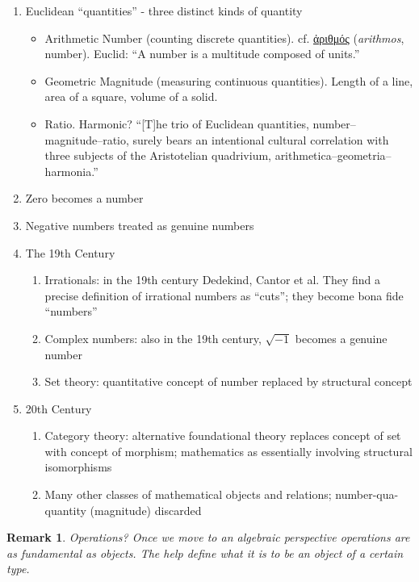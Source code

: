 \documentclass[11pt,twoside]{article}
\newtheorem{remark}{Remark}
\begin{document}
\begin{enumerate}
\item Euclidean ``quantities'' - three distinct kinds of quantity
\begin{itemize}
\item Arithmetic Number (counting discrete quantities).  cf. \href{http://www.perseus.tufts.edu/hopper/text?doc=Perseus\%3Atext\%3A1999.04.0057\%3Aentry\%3Da)riqmo\%2Fs}{ἀριθμός} (\textit{arithmos}, number).  Euclid: ``A number is a multitude composed of units.''
\item Geometric Magnitude (measuring continuous quantities).  Length of a line, area of a square, volume of a solid.
\item Ratio.  Harmonic?  ``[T]he trio of Euclidean quantities,
  number–magnitude–ratio, surely bears an intentional cultural
  correlation with three subjects of the Aristotelian quadrivium,
  arithmetica–geometria–harmonia.'' \cite[367]{grattan-guinness_numbers_1996}
\end{itemize}
\item Zero becomes a number
\item Negative numbers treated as genuine numbers
\item The 19th Century
\begin{enumerate}
\item Irrationals: in the 19th century Dedekind, Cantor et al.  They
  find a precise definition of irrational numbers as ``cuts''; they
  become bona fide ``numbers''
\item Complex numbers: also in the 19th century, $\sqrt{-1}$ becomes a genuine number
\item Set theory: quantitative concept of number replaced by structural concept
\end{enumerate}
\item 20th Century
\begin{enumerate}
\item Category theory: alternative foundational theory replaces concept of set with concept of morphism; mathematics as essentially involving structural isomorphisms
\item Many other classes of mathematical objects and relations; number-qua-quantity (magnitude) discarded
\end{enumerate}
\end{enumerate}

\begin{remark}
  Operations?  Once we move to an algebraic perspective operations are
  as fundamental as objects.  The help define what it is to be an
  object of a certain type.
\end{remark}
\end{document}
